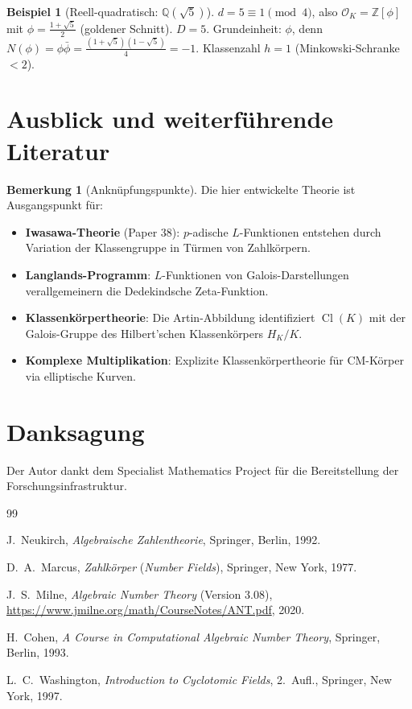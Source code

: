 \documentclass[12pt,a4paper]{amsart}
\theoremstyle{definition}
\newtheorem{example}[theorem]{Beispiel}
\newtheorem{remark}[theorem]{Bemerkung}
\newcommand{\Z}{\mathbb{Z}}
\newcommand{\Q}{\mathbb{Q}}
\newcommand{\OK}{\mathcal{O}_K}
\DeclareMathOperator{\Cl}{Cl}
\begin{document}
\begin{example}[Reell-quadratisch: $\Q(\sqrt{5})$]
$d = 5 \equiv 1 \pmod{4}$, also $\OK = \Z[\phi]$ mit $\phi = \tfrac{1+\sqrt{5}}{2}$
(goldener Schnitt).  $D = 5$.
Grundeinheit: $\phi$, denn $N(\phi) = \phi\bar\phi = \tfrac{(1+\sqrt{5})(1-\sqrt{5})}{4}
= -1$.  Klassenzahl $h = 1$ (Minkowski-Schranke $< 2$).
\end{example}

\section{Ausblick und weiterführende Literatur}

\begin{remark}[Anknüpfungspunkte]
Die hier entwickelte Theorie ist Ausgangspunkt für:
\begin{itemize}
  \item \textbf{Iwasawa-Theorie} (Paper 38): $p$-adische $L$-Funktionen
    entstehen durch Variation der Klassengruppe in Türmen von Zahlkörpern.
  \item \textbf{Langlands-Programm}: $L$-Funktionen von Galois-Darstellungen
    verallgemeinern die Dedekindsche Zeta-Funktion.
  \item \textbf{Klassenkörpertheorie}: Die Artin-Abbildung identifiziert
    $\Cl(K)$ mit der Galois-Gruppe des Hilbert'schen Klassenkörpers $H_K/K$.
  \item \textbf{Komplexe Multiplikation}: Explizite Klassenkörpertheorie
    für CM-Körper via elliptische Kurven.
\end{itemize}
\end{remark}

\section*{Danksagung}
Der Autor dankt dem Specialist Mathematics Project für die Bereitstellung
der Forschungsinfrastruktur.

\begin{thebibliography}{99}

J.~Neukirch,
\textit{Algebraische Zahlentheorie},
Springer, Berlin, 1992.

D.~A.~Marcus,
\textit{Zahlkörper} (\textit{Number Fields}),
Springer, New York, 1977.

J.~S.~Milne,
\textit{Algebraic Number Theory} (Version 3.08),
\url{https://www.jmilne.org/math/CourseNotes/ANT.pdf}, 2020.

H.~Cohen,
\textit{A Course in Computational Algebraic Number Theory},
Springer, Berlin, 1993.

L.~C.~Washington,
\textit{Introduction to Cyclotomic Fields},
2.\ Aufl., Springer, New York, 1997.

\end{thebibliography}
\end{document}

